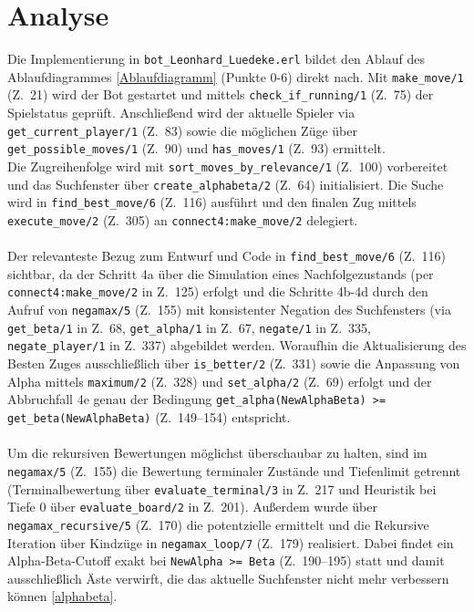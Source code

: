 %

\section{Analyse}

Die Implementierung in \texttt{bot\_Leonhard\_Luedeke.erl} bildet den Ablauf des Ablaufdiagrammes \ref{Ablaufdiagramm} (Punkte 0-6) direkt nach. Mit \texttt{make\_move/1} (Z.\ 21) wird der Bot gestartet und mittels \texttt{check\_if\_running/1} (Z.\ 75) der Spielstatus geprüft. Anschließend wird der aktuelle Spieler via \texttt{get\_current\_player/1} (Z.\ 83) sowie die möglichen Züge über \texttt{get\_possible\_moves/1} (Z.\ 90) und \texttt{has\_moves/1} (Z.\ 93) ermittelt. \\ Die Zugreihenfolge wird mit \texttt{sort\_moves\_by\_relevance/1} (Z.\ 100) vorbereitet und das Suchfenster über \texttt{create\_alphabeta/2} (Z.\ 64) initialisiert. Die Suche wird in \texttt{find\_best\_move/6} (Z.\ 116) ausführt und den finalen Zug mittels \texttt{execute\_move/2} (Z.\ 305) an \texttt{connect4:make\_move/2} delegiert. 
\\\\ 
Der relevanteste Bezug zum Entwurf und Code in \texttt{find\_best\_move/6} (Z.\ 116) sichtbar, da der Schritt 4a über die Simulation eines Nachfolgezustands (per \texttt{connect4:make\_move/2} in Z.\ 125) erfolgt und die Schritte 4b-4d durch den Aufruf von \texttt{negamax/5} (Z.\ 155) mit konsistenter Negation des Suchfensters (via \texttt{get\_beta/1} in Z.\ 68, \texttt{get\_alpha/1} in Z.\ 67, \texttt{negate/1} in Z.\ 335, \texttt{negate\_player/1} in Z.\ 337) abgebildet werden. 
Woraufhin die Aktualisierung des Besten Zuges ausschließlich über \texttt{is\_better/2} (Z.\ 331) sowie die Anpassung von Alpha mittels \texttt{maximum/2} (Z.\ 328) und \texttt{set\_alpha/2} (Z.\ 69) erfolgt und der Abbruchfall 4e genau der Bedingung \texttt{get\_alpha(NewAlphaBeta) >= get\_beta(NewAlphaBeta)} (Z.\ 149--154) entspricht.
\\\\
Um die rekursiven Bewertungen möglichst überschaubar zu halten, sind im \texttt{negamax/5} (Z.\ 155) die Bewertung terminaler Zustände und Tiefenlimit  getrennt (Terminalbewertung über \texttt{evaluate\_terminal/3} in Z.\ 217 und Heuristik bei Tiefe 0 über \texttt{evaluate\_board/2} in Z.\ 201).
Außerdem wurde über \texttt{negamax\_recursive/5} (Z.\ 170) die potentzielle ermittelt und die Rekursive Iteration über Kindzüge in \texttt{negamax\_loop/7} (Z.\ 179) realisiert. Dabei findet ein Alpha-Beta-Cutoff exakt bei \texttt{NewAlpha >= Beta} (Z.\ 190--195) statt und damit ausschließlich Äste verwirft, die das aktuelle Suchfenster nicht mehr verbessern können \ref{alphabeta}. 

